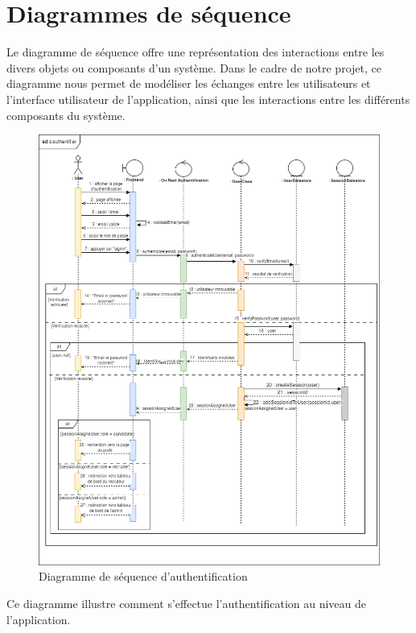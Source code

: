 \section{Diagrammes de séquence}
Le diagramme de séquence offre une représentation  
des interactions entre les divers objets ou 
composants d’un système. Dans le cadre de notre projet, 
ce diagramme nous permet de modéliser les échanges entre les utilisateurs et l’interface 
utilisateur de l’application, ainsi que les interactions entre les différents composants du système.

\begin{figure}[htbp]
   \centering
   \includegraphics[scale=0.5]{diag/auth.png} %
   \caption{Diagramme de séquence d’authentification}
   \label{fig:seq1}
\end{figure}
Ce diagramme illustre comment s'effectue l'authentification au niveau de l'application.
\\

